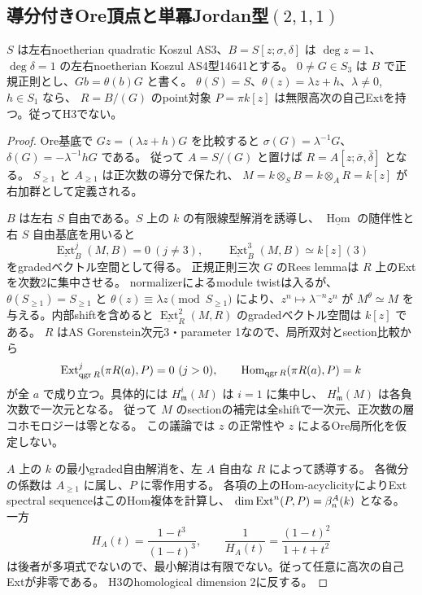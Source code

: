 \subsection{導分付きOre頂点と単冪Jordan型\texorpdfstring{$(2,1,1)$}{(2,1,1)}}
\label{subsec:cubic-jordan211-ore-vertex}
\begin{lemma}[導分付きOre拡大の三次base切断の頂点]
\label{lem:cubic-derivation-Ore-vertex}
$S$ は左右noetherian quadratic Koszul AS3、$B=S[z;\sigma,\delta]$ は
$\deg z=1$、$\deg\delta=1$ の左右noetherian Koszul AS4型14641とする。
$0\ne G\in S_3$ は $B$ で正規正則とし、$Gb=\theta(b)G$ と書く。
$\theta(S)=S$、$\theta(z)=\lambda z+h$、$\lambda\ne0$, $h\in S_1$ なら、
$R=B/(G)$ のpoint対象 $P=\pi k[z]$ は無限高次の自己Extを持つ。従ってH3でない。
\end{lemma}
\begin{proof}
Ore基底で $Gz=(\lambda z+h)G$ を比較すると
$\sigma(G)=\lambda^{-1}G$、$\delta(G)=-\lambda^{-1}hG$ である。
従って $A=S/(G)$ と置けば $R=A[z;\bar\sigma,\bar\delta]$ となる。
$S_{\ge1}$ と $A_{\ge1}$ は正次数の導分で保たれ、
$M=k\otimes_SB=k\otimes_AR=k[z]$ が右加群として定義される。

$B$ は左右 $S$ 自由である。$S$ 上の $k$ の有限線型解消を誘導し、
$\underline{\operatorname{Hom}}$ の随伴性と右 $S$ 自由基底を用いると
\[
 \underline{\operatorname{Ext}}_B^j(M,B)=0\ (j\ne3),\qquad
 \underline{\operatorname{Ext}}_B^3(M,B)\simeq k[z](3)
\]
をgradedベクトル空間として得る。
正規正則三次 $G$ のRees lemmaは $R$ 上のExtを次数2に集中させる。
normalizerによるmodule twistは入るが、$\theta(S_{\ge1})=S_{\ge1}$ と
$\theta(z)\equiv\lambda z\pmod{S_{\ge1}}$ により、$z^n\mapsto\lambda^{-n}z^n$ が
$M^\theta\simeq M$ を与える。内部shiftを含めると
$\underline{\operatorname{Ext}}_R^2(M,R)$ のgradedベクトル空間は $k[z]$ である。
$R$ はAS Gorenstein次元3・parameter 1なので、局所双対とsection比較から
\[
 \operatorname{Ext}_{\qgr R}^j(\pi R(a),P)=0\ (j>0),\qquad
 \operatorname{Hom}_{\qgr R}(\pi R(a),P)=k
\]
が全 $a$ で成り立つ。具体的には $H^i_{\mathfrak m}(M)$ は $i=1$ に集中し、
$H^1_{\mathfrak m}(M)$ は各負次数で一次元となる。
従って $M$ のsectionの補完は全shiftで一次元、正次数の層コホモロジーは零となる。
この議論では $z$ の正常性や $z$ によるOre局所化を仮定しない。

$A$ 上の $k$ の最小graded自由解消を、左 $A$ 自由な $R$ によって誘導する。
各微分の係数は $A_{\ge1}$ に属し、$P$ に零作用する。
各項の上のHom-acyclicityによりExt spectral sequenceはこのHom複体を計算し、
$\dim\operatorname{Ext}^n(P,P)=\beta_n^A(k)$ となる。
一方
\[
 H_A(t)=\frac{1-t^3}{(1-t)^3},\qquad
 \frac1{H_A(t)}=\frac{(1-t)^2}{1+t+t^2}
\]
は後者が多項式でないので、最小解消は有限でない。従って任意に高次の自己Extが非零である。
H3のhomological dimension 2に反する。
\end{proof}

